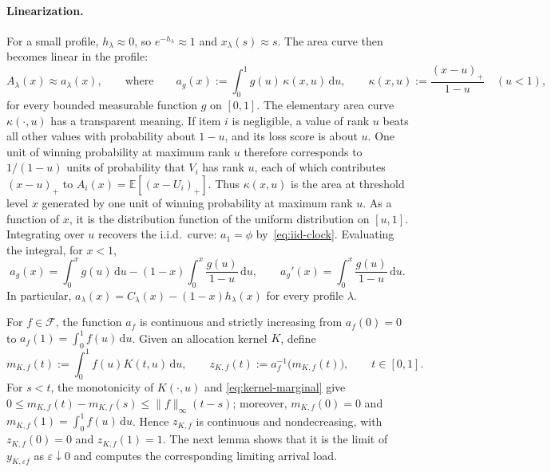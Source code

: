 \documentclass[11pt]{article}
\theoremstyle{definition}
\theoremstyle{remark}
\newcommand{\E}{\mathbb E}
\newcommand{\dd}{\,\mathrm d}
\begin{document}
\paragraph{Linearization.}
For a small profile, $h_\lambda\approx0$, so $e^{-h_\lambda}\approx1$ and $x_\lambda(s)\approx s$.
The area curve then becomes linear in the profile:
\[
 A_\lambda(x)\approx a_\lambda(x),
 \qquad\text{where}\qquad
 a_g(x):=\int_0^1g(u)\,\kappa(x,u)\dd u,
 \qquad
 \kappa(x,u):=\frac{(x-u)_+}{1-u}\quad(u<1),
\]
for every bounded measurable function $g$ on $[0,1]$.
The elementary area curve $\kappa(\cdot,u)$ has a transparent meaning.
If item $i$ is negligible, a value of rank $u$ beats all other values with probability about $1-u$, and its loss score is about $u$.
One unit of winning probability at maximum rank $u$ therefore corresponds to $1/(1-u)$ units of probability that $V_i$ has rank $u$, each of which contributes $(x-u)_+$ to $A_i(x)=\E[(x-U_i)_+]$.
Thus $\kappa(x,u)$ is the area at threshold level $x$ generated by one unit of winning probability at maximum rank $u$.
As a function of $x$, it is the distribution function of the uniform distribution on $[u,1]$.
Integrating over $u$ recovers the i.i.d.\ curve: $a_1=\phi$ by~\eqref{eq:iid-clock}.
Evaluating the integral, for $x<1$,
\begin{equation}\label{eq:linearized-area}
 a_g(x)=\int_0^xg(u)\dd u-(1-x)\int_0^x\frac{g(u)}{1-u}\dd u,
 \qquad
 a_g'(x)=\int_0^x\frac{g(u)}{1-u}\dd u.
\end{equation}
In particular, $a_\lambda(x)=C_\lambda(x)-(1-x)h_\lambda(x)$ for every profile $\lambda$.

For $f\in\mathcal F$, the function $a_f$ is continuous and strictly increasing from $a_f(0)=0$ to $a_f(1)=\int_0^1 f(u)\dd u$.
Given an allocation kernel $K$, define
\begin{equation}\label{eq:rare-area-allocation}
 m_{K,f}(t):=\int_0^1f(u)K(t,u)\dd u,
 \qquad
 z_{K,f}(t):=a_f^{-1}\bigl(m_{K,f}(t)\bigr),
 \qquad t\in[0,1].
\end{equation}
For $s<t$, the monotonicity of $K(\cdot,u)$ and
\eqref{eq:kernel-marginal} give
$0\le m_{K,f}(t)-m_{K,f}(s)\le\|f\|_\infty(t-s)$; moreover, $m_{K,f}(0)=0$ and $m_{K,f}(1)=\int_0^1 f(u)\dd u$.
Hence $z_{K,f}$ is continuous and nondecreasing, with
$z_{K,f}(0)=0$ and $z_{K,f}(1)=1$.
The next lemma shows that it is the limit of $y_{K,\varepsilon f}$
as $\varepsilon\downarrow0$ and computes the corresponding limiting
arrival load.
\end{document}
